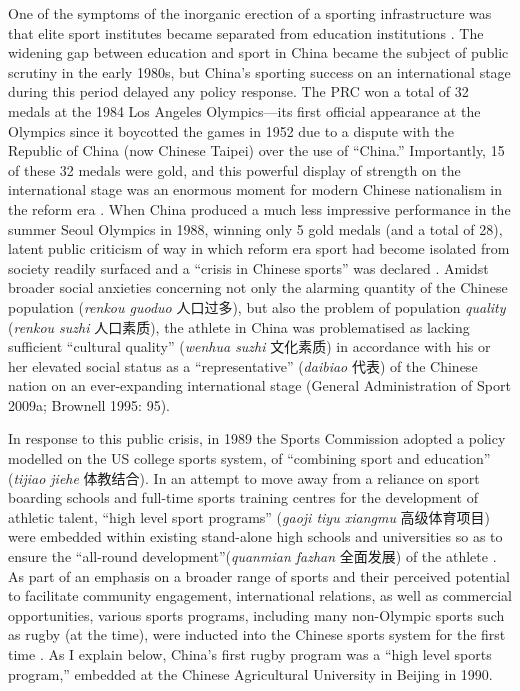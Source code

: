 \begin{CJK}{UTF8}{gbsn}
 One of the symptoms of the inorganic erection of a sporting infrastructure was that elite sport institutes became separated from education institutions \citep{Brownell2008}.  The widening gap between education and sport in China became the subject of public scrutiny in the early 1980s, but China's sporting success on an international stage during this period delayed any policy response.  The PRC won a total of 32 medals at the 1984 Los Angeles Olympics---its first official appearance at the Olympics since it boycotted the games in 1952 due to a dispute with the Republic of China (now Chinese Taipei) over the use of ``China.''  Importantly, 15 of these 32 medals were gold, and this powerful display of strength on the international stage was an enormous moment for modern Chinese nationalism in the reform era \citep{Brownell2008}.  When China produced a much less impressive performance in the summer Seoul Olympics in 1988, winning only 5 gold medals (and a total of 28), latent public criticism of way in which reform era sport had become isolated from society readily surfaced and a ``crisis in Chinese sports'' was declared \citep[199]{Brownell1995}.  Amidst broader social anxieties concerning not only the alarming quantity of the Chinese population (\textit{renkou guoduo} 人口过多), but also the problem of population \textit{quality} (\textit{renkou suzhi} 人口素质), the athlete in China was problematised as lacking sufficient ``cultural quality'' (\textit{wenhua suzhi} 文化素质) in accordance with his or her elevated social status as a ``representative'' (\textit{daibiao} 代表) of the Chinese nation on an ever-expanding international stage (General Administration of Sport 2009a; Brownell 1995: 95).

 In response to this public crisis, in 1989 the Sports Commission adopted a policy modelled on the US college sports system, of ``combining sport and education'' (\textit{tijiao jiehe} 体教结合).  In an attempt to move away from a reliance on sport boarding schools and full-time sports training centres for the development of athletic talent, ``high level sport programs'' (\textit{gaoji tiyu xiangmu} 高级体育项目) were embedded within existing stand-alone high schools and universities so as to ensure the ``all-round development''(\textit{quanmian fazhan} 全面发展) of the athlete \citep[203]{Brownell1995}.  As part of an emphasis on a broader range of sports and their perceived potential to facilitate community engagement, international relations, as well as commercial opportunities, various sports programs, including many non-Olympic sports such as rugby (at the time), were inducted into the Chinese sports system for the first time \citep[70]{Knuttgen1990}.  As I explain below, China's first rugby program was a ``high level sports program,'' embedded at the Chinese Agricultural University in Beijing in 1990.


\end{CJK}
